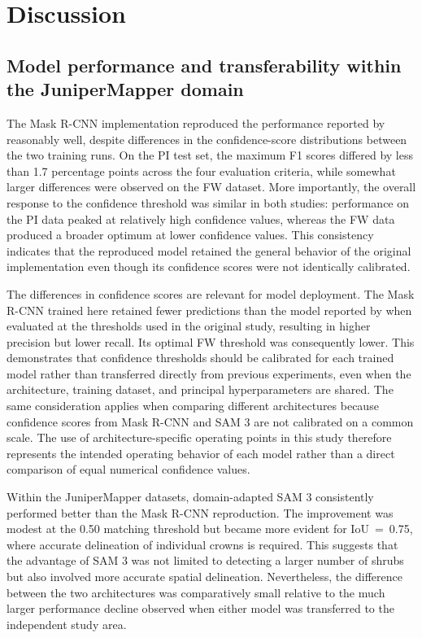 \documentclass[12pt,a4paper]{article}
\begin{document}
\section{Discussion}

\subsection{Model performance and transferability within the JuniperMapper domain}

The Mask R-CNN implementation reproduced the performance reported by \citet{khaldi2024individual} reasonably well, despite differences in the confidence-score distributions between the two training runs. On the PI test set, the maximum F1 scores differed by less than 1.7 percentage points across the four evaluation criteria, while somewhat larger differences were observed on the FW dataset. More importantly, the overall response to the confidence threshold was similar in both studies: performance on the PI data peaked at relatively high confidence values, whereas the FW data produced a broader optimum at lower confidence values. This consistency indicates that the reproduced model retained the general behavior of the original implementation even though its confidence scores were not identically calibrated.

The differences in confidence scores are relevant for model deployment. The Mask R-CNN trained here retained fewer predictions than the model reported by \citet{khaldi2024individual} when evaluated at the thresholds used in the original study, resulting in higher precision but lower recall. Its optimal FW threshold was consequently lower. This demonstrates that confidence thresholds should be calibrated for each trained model rather than transferred directly from previous experiments, even when the architecture, training dataset, and principal hyperparameters are shared. The same consideration applies when comparing different architectures because confidence scores from Mask R-CNN and SAM 3 are not calibrated on a common scale. The use of architecture-specific operating points in this study therefore represents the intended operating behavior of each model rather than a direct comparison of equal numerical confidence values.

Within the JuniperMapper datasets, domain-adapted SAM 3 consistently performed better than the Mask R-CNN reproduction. The improvement was modest at the 0.50 matching threshold but became more evident for IoU~=~0.75, where accurate delineation of individual crowns is required. This suggests that the advantage of SAM 3 was not limited to detecting a larger number of shrubs but also involved more accurate spatial delineation. Nevertheless, the difference between the two architectures was comparatively small relative to the much larger performance decline observed when either model was transferred to the independent study area.
\end{document}
